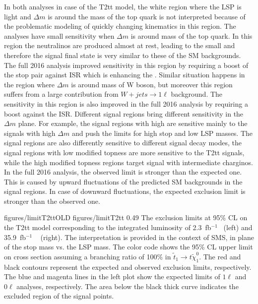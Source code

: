 In both analyses in case of the T2tt model, the white region where the LSP is light and $\Delta m$ is around the mass of the top quark is not interpreted because of the problematic modeling of quickly changing kinematics in this region. The analyses have small sensitivity when $\Delta m$ is around mass of the top quark. In this region the neutralinos are produced almost at rest, leading to the small \MET and therefore the signal final state is very similar to these of the SM backgrounds. The full 2016 analysis improved sensitivity in this region by requiring a boost of the stop pair against ISR which is enhancing the \MET. Similar situation happens in the region where $\Delta m$ is around mass of W boson, but moreover this region suffers from a  large contribution from $W+jets \to 1\ell$ background. The sensitivity in this region is also improved in the full 2016 analysis by requiring a boost against the ISR. Different signal regions bring different sensitivity in the $\Delta m$ plane. For example, the signal regions with high \MET are sensitive mainly to the signals with high $\Delta m$ and push the limits for high stop and low LSP masses. The signal regions are also differently sensitive to different signal decay modes, the signal regions with low modified topness are more sensitive to the T2tt signals,  while the high modified topness regions target signal with intermediate charginos. In the full 2016 analysis, the observed limit is stronger than the expected one. This is caused by upward fluctuations of the predicted SM backgrounds in the signal regions. In case of downward fluctuations, the expected exclusion limit is stronger than the observed one.

                 {figures/limitT2ttOLD} %
                 {figures/limitT2tt} %
                 {0.49}       %
                 { The exclusion limits at 95\% CL on the T2tt model corresponding to the integrated luminosity of 2.3~fb$^{-1}$~\cite{Sirunyan:2016jpr} (left) and   35.9~fb$^{-1}$ ~\cite{Sirunyan:2017xse} (right). The interpretation is provided in the context of SMS, in plane of the stop mass vs. the LSP mass. The color code shows the 95\% CL upper limit on cross section assuming a branching ratio of 100\% in $ \tilde{t}_{1} \to t  \tilde{\chi}^{0}_{1} $. The red and black contours represent the expected and observed exclusion limits, respectively. The blue and magenta lines in the left plot show the expected limits of $1 \ell$ and $0 \ell$ analyses, respectively.  The area below the black thick curve indicates the excluded region of the signal points.  }

